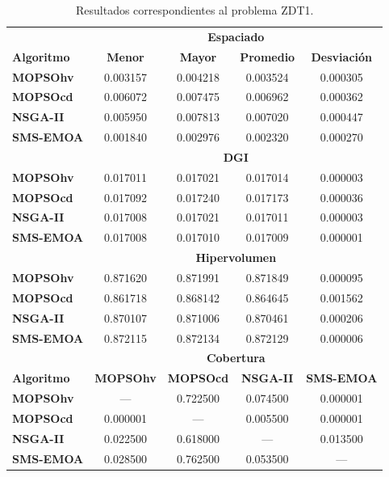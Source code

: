  \begin{table}
 \begin{center}
  \begin{tabular}{|l||cc|cc|} \hline
    & \multicolumn{4}{|c|}{\textbf{Espaciado}} \\     
	\textbf{Algoritmo} & \textbf{Menor} & \textbf{Mayor} & \textbf{Promedio} & \textbf{Desviaci\'on} \\  \hline \hline
	\textbf{MOPSOhv} &0.003157 & 0.004218 & 0.003524 & 0.000305  \\ 
	\textbf{MOPSOcd} &0.006072 & 0.007475 & 0.006962 & 0.000362  \\ 
	\textbf{NSGA-II} &0.005950 & 0.007813 & 0.007020 & 0.000447   \\  
	\textbf{SMS-EMOA}&0.001840 & 0.002976 & 0.002320 & 0.000270  \\  
	\hline\hline
    & \multicolumn{4}{|c|}{\textbf{DGI}} \\  \hline \hline
	\textbf{MOPSOhv} &0.017011 & 0.017021 & 0.017014 & 0.000003  \\ 
	\textbf{MOPSOcd} &0.017092 & 0.017240 & 0.017173 & 0.000036 \\ 
	\textbf{NSGA-II} &0.017008 & 0.017021 & 0.017011 & 0.000003 \\  
	\textbf{SMS-EMOA}&0.017008 & 0.017010 & 0.017009 & 0.000001   \\  
	\hline\hline
    & \multicolumn{4}{|c|}{\textbf{Hipervolumen}} \\ \hline\hline 
	\textbf{MOPSOhv} &0.871620 & 0.871991 & 0.871849 & 0.000095  \\ 
	\textbf{MOPSOcd} &0.861718 & 0.868142 & 0.864645 & 0.001562 \\ 
	\textbf{NSGA-II} &0.870107 & 0.871006 & 0.870461 & 0.000206 \\  
	\textbf{SMS-EMOA}&0.872115 & 0.872134 & 0.872129 & 0.000006 \\  
	\hline\hline
   & \multicolumn{4}{|c|}{\textbf{Cobertura}} \\ \hline\hline 
	\textbf{Algoritmo} & \textbf{MOPSOhv} & \textbf{MOPSOcd} & \textbf{NSGA-II} & \textbf{SMS-EMOA} \\  \hline \hline
	\textbf{MOPSOhv} & ---      & 0.722500  & 0.074500 & 0.000001  \\ 
	\textbf{MOPSOcd} & 0.000001 & ---       & 0.005500 & 0.000001 \\ 
	\textbf{NSGA-II} & 0.022500 & 0.618000  & ---      & 0.013500 \\  
	\textbf{SMS-EMOA}& 0.028500 & 0.762500  & 0.053500 & --- \\  
	\hline
	\end{tabular}
    \caption{Resultados correspondientes al problema ZDT1.}
  \label{tab:zdt1}
\end{center}
\end{table}
